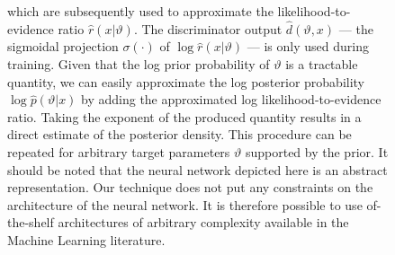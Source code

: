 \documentclass[fleqn,usenatbib]{mnras}
\begin{document}
\begin{figure}
{    which are subsequently used to approximate the likelihood-to-evidence ratio $\hat{r}(x\vert\vartheta)$.
    The discriminator output $\hat{d}(\vartheta, x)$ --- the sigmoidal projection $\sigma(\cdot)$ of $\log\hat{r}(x\vert\vartheta)$ --- is only used during training. Given that the log prior probability of $\vartheta$ is a tractable quantity, we can easily approximate the log posterior probability $\log\hat{p}(\vartheta\vert x)$ by adding
    the approximated log likelihood-to-evidence ratio. Taking the exponent of the produced quantity results in a direct estimate of the posterior density. This procedure can be repeated for arbitrary target parameters $\vartheta$ supported by the prior.
    It should be noted that the neural network depicted here is an abstract representation. Our technique does not put
    any constraints on the architecture of the neural network. It is therefore possible to use of-the-shelf architectures of arbitrary complexity available in the Machine Learning literature.}
    \label{fig:overview}
\end{figure}
\end{document}
